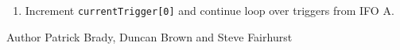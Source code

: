 \begin{entry}
\begin{enumerate}
\begin{enumerate}
\item Increment \texttt{currentTrigger[0]} and continue loop over triggers
from IFO A.
\end{enumerate}
\end{enumerate}

\item[Author] 
Patrick Brady, Duncan Brown and Steve Fairhurst
\end{entry}


